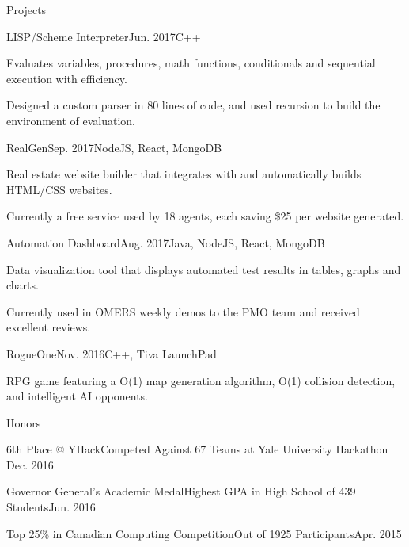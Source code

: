 \documentclass{resume} %
\begin{document}
\begin{rSection}{Projects}

\begin{projSec}{LISP/Scheme Interpreter}{Jun. 2017}{C++ \href{https://github.com/jsun98/SchemePlusPlus}{\space\faGithub}}
\item Evaluates variables, procedures, math functions, conditionals and sequential execution with efficiency.
\item Designed a custom parser in 80 lines of code, and used recursion to build the environment of evaluation.
\end{projSec}

\begin{projSec}{RealGen}{Sep. 2017}{NodeJS, React, MongoDB \href{https://github.com/jsun98/RealGen}{\space\faGithub}}
\item Real estate website builder that integrates with \href{http://www.mls.com/}{\color{gray}{MLS}} and automatically builds HTML/CSS websites.
\item Currently a free service used by 18 agents, each saving \$25 per website generated.
\end{projSec}

\begin{projSec}{Automation Dashboard}{Aug. 2017}{Java, NodeJS, React, MongoDB \href{https://github.com/AutoNinja/automation-dashboard}{\space\faGithub}}
\item Data visualization tool that displays automated test results in tables, graphs and charts.
\item Currently used in OMERS weekly demos to the PMO team and received excellent reviews.
\end{projSec}

\begin{projSec}{RogueOne}{Nov. 2016}{C++, Tiva LaunchPad \href{https://github.com/jsun98/RogueOne}{\space\faGithub}}
\item RPG game featuring a O(1) map generation algorithm, O(1) collision detection, and intelligent AI opponents.
\end{projSec}

\end{rSection}


\begin{rSection}{Honors}

\begin{honorSec}{6th Place @ YHack}{Competed Against 67 Teams at Yale University Hackathon \href{https://devpost.com/software/yhack_unity_zombies}{\space\small\faExternalLink}}{Dec. 2016}\end{honorSec}
\begin{honorSec}{Governor General's Academic Medal}{Highest GPA in High School of 439 Students}{Jun. 2016}\end{honorSec}
\begin{honorSec}{Top 25\% in Canadian Computing Competition}{Out of 1925 Participants}{Apr. 2015}\end{honorSec}
\vspace{1em} 

\end{rSection}
\end{document}
